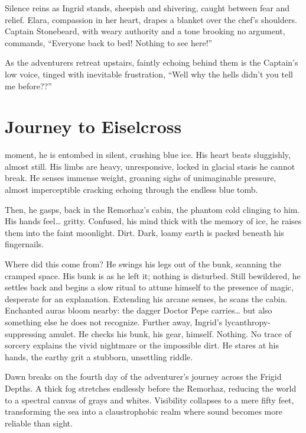 \documentclass[
  letterpaper,12pt,twoside,twocolumn,openany,
  nodeprecatedcode,bg=full]{dndbook}
\begin{document}
Silence reins as Ingrid stands, sheepish and shivering, caught between
fear and relief. Elara, compassion in her heart, drapes a blanket over
the chef's shoulders. Captain Stonebeard, with weary authority and a
tone brooking no argument, commands, ``Everyone back to bed! Nothing to
see here!''

As the adventurers retreat upstairs, faintly echoing behind them is the
Captain's low voice, tinged with inevitable frustration, ``Well why the
hells didn't you tell me before??''

\chapter{Journey to Eiselcross}\label{journey-to-eiselcross}

\hfill\break moment, he is
entombed in silent, crushing blue ice. His heart beats sluggishly,
almost still. His limbs are heavy, unresponsive, locked in glacial
stasis he cannot break. He senses immense weight, groaning sighs of
unimaginable pressure, almost imperceptible cracking echoing through the
endless blue tomb.

Then, he gasps, back in the Remorhaz's cabin, the phantom cold clinging
to him. His hands feel\ldots{} gritty. Confused, his mind thick with the
memory of ice, he raises them into the faint moonlight. Dirt. Dark,
loamy earth is packed beneath his fingernails.

Where did this come from? He swings his legs out of the bunk, scanning
the cramped space. His bunk is as he left it; nothing is disturbed.
Still bewildered, he settles back and begins a slow ritual to attune
himself to the presence of magic, desperate for an explanation.
Extending his arcane senses, he scans the cabin. Enchanted auras bloom
nearby: the dagger Doctor Pepe carries\ldots{} but also something else
he does not recognize. Further away, Ingrid's lycanthropy-suppressing
amulet. He checks his bunk, his gear, himself. Nothing. No trace of
sorcery explains the vivid nightmare or the impossible dirt. He stares
at his hands, the earthy grit a stubborn, unsettling riddle.

Dawn breaks on the fourth day of the adventurer's journey across the
Frigid Depths. A thick fog stretches endlessly before the Remorhaz,
reducing the world to a spectral canvas of grays and whites. Visibility
collapses to a mere fifty feet, transforming the sea into a
claustrophobic realm where sound becomes more reliable than sight.
\end{document}
